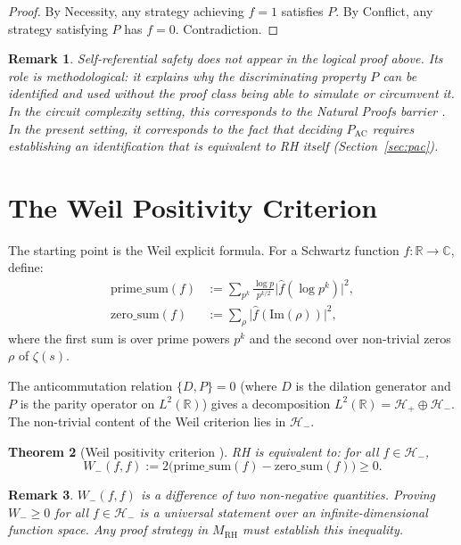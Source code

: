 \documentclass[12pt]{article}
\newtheorem{theorem}{Theorem}[section]
\newtheorem{remark}[theorem]{Remark}
\newcommand{\RR}{\mathbb{R}}
\newcommand{\CC}{\mathbb{C}}
\newcommand{\Hminus}{\mathcal{H}_-}
\newcommand{\MRH}{M_{\mathrm{RH}}}
\newcommand{\PAC}{P_{\mathrm{AC}}}
\begin{document}
\begin{proof}
By Necessity, any strategy achieving $f=1$ satisfies $P$.
By Conflict, any strategy satisfying $P$ has $f=0$. Contradiction.
\end{proof}

\begin{remark}
Self-referential safety does not appear in the logical proof above.
Its role is \emph{methodological}: it explains why the discriminating
property $P$ can be identified and used without the proof class
being able to simulate or circumvent it. In the circuit complexity
setting, this corresponds to the Natural Proofs barrier
\cite{razborov-rudich1994}. In the present setting, it corresponds
to the fact that deciding $\PAC$ requires establishing an identification
that is equivalent to RH itself (Section~\ref{sec:pac}).
\end{remark}

\section{The Weil Positivity Criterion}
\label{sec:weil}

The starting point is the Weil explicit formula. For a Schwartz
function $f: \RR \to \CC$, define:
\begin{align}
\mathrm{prime\_sum}(f) &:= \sum_{p^k}
  \frac{\log p}{p^{k/2}} \bigl|\hat{f}(\log p^k)\bigr|^2, \\
\mathrm{zero\_sum}(f) &:= \sum_{\rho} \bigl|\hat{f}(\mathrm{Im}(\rho))\bigr|^2,
\end{align}
where the first sum is over prime powers $p^k$ and the second over
non-trivial zeros $\rho$ of $\zeta(s)$.

The anticommutation relation $\{D, P\} = 0$ (where $D$ is the dilation
generator and $P$ is the parity operator on $L^2(\RR)$) gives a
decomposition $L^2(\RR) = \mathcal{H}_+ \oplus \Hminus$. The
non-trivial content of the Weil criterion lies in $\Hminus$.

\begin{theorem}[Weil positivity criterion \cite{weil1952}]
\label{thm:weil}
RH is equivalent to: for all $f \in \Hminus$,
\[
W_-(f,f) := 2\bigl(\mathrm{prime\_sum}(f) - \mathrm{zero\_sum}(f)\bigr)
\geq 0.
\]
\end{theorem}

\begin{remark}
$W_-(f,f)$ is a difference of two non-negative quantities. Proving
$W_- \geq 0$ for all $f \in \Hminus$ is a universal statement over
an infinite-dimensional function space. Any proof strategy in $\MRH$
must establish this inequality.
\end{remark}
\end{document}
